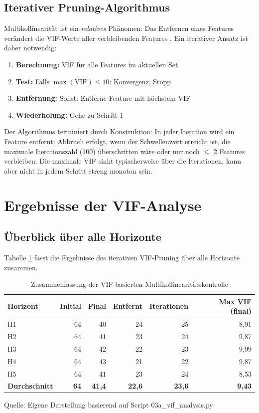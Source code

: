 \subsection{Iterativer Pruning-Algorithmus}

Multikollinearität ist ein \textit{relatives} Phänomen: Das Entfernen eines Features verändert die VIF-Werte aller verbleibenden Features \parencite{obrien2007caution}. Ein iterativer Ansatz ist daher notwendig:

\begin{enumerate}[topsep=0.2\baselineskip]
    \item \textbf{Berechnung:} VIF für alle Features im aktuellen Set
    \item \textbf{Test:} Falls $\max(\text{VIF}) \leq 10$: Konvergenz, Stopp
    \item \textbf{Entfernung:} Sonst: Entferne Feature mit höchstem VIF
    \item \textbf{Wiederholung:} Gehe zu Schritt 1
\end{enumerate}

Der Algorithmus terminiert durch Konstruktion: In jeder Iteration wird ein Feature entfernt; Abbruch erfolgt, wenn der Schwellenwert erreicht ist, die maximale Iterationszahl (100) überschritten wäre oder nur noch $\leq$ 2 Features verbleiben. Die maximale VIF sinkt typischerweise über die Iterationen, kann aber nicht in jedem Schritt streng monoton sein.

\section{Ergebnisse der VIF-Analyse}

\subsection{Überblick über alle Horizonte}

Tabelle \ref{tab:vif_summary} fasst die Ergebnisse des iterativen VIF-Pruning über alle Horizonte zusammen.

\begin{table}[htbp]
\centering
\caption{Zusammenfassung der VIF-basierten Multikollinearitätskontrolle}
\label{tab:vif_summary}
\begin{tabular}{lrrrrr}
\toprule
\textbf{Horizont} & \textbf{Initial} & \textbf{Final} & \textbf{Entfernt} & \textbf{Iterationen} & \textbf{Max VIF (final)} \\
\midrule
H1 & 64 & 40 & 24 & 25 & 8,91 \\
H2 & 64 & 41 & 23 & 24 & 9,87 \\
H3 & 64 & 42 & 22 & 23 & 9,99 \\
H4 & 64 & 43 & 21 & 22 & 9,87 \\
H5 & 64 & 41 & 23 & 24 & 8,53 \\
\midrule
\textbf{Durchschnitt} & \textbf{64} & \textbf{41{,}4} & \textbf{22{,}6} & \textbf{23{,}6} & \textbf{9{,}43} \\
\bottomrule
\end{tabular}
\par\smallskip
{\footnotesize Quelle: Eigene Darstellung basierend auf Script 03a\_vif\_analysis.py}
\end{table}

